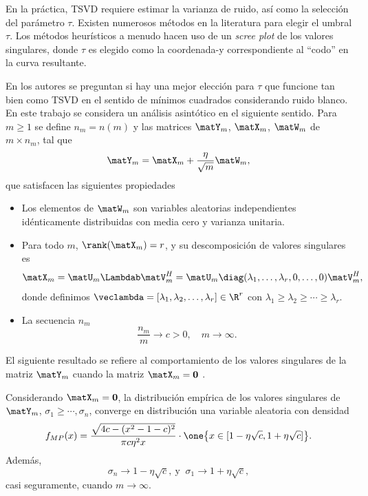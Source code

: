 	En la práctica, TSVD requiere estimar la varianza de ruido, así como la selección del parámetro $\tau$. Existen numerosos métodos en la literatura para elegir el umbral $\tau$. Los métodos heurísticos a menudo hacen uso de un \emph{scree plot} de los valores singulares, donde $\tau$ es elegido como la coordenada-y correspondiente al ``codo'' en la curva resultante.
		
	En \cite{Gavish2014} los autores se preguntan si hay una mejor elección para $\tau$ que funcione tan bien como TSVD en el sentido de mínimos cuadrados considerando ruido blanco. En este trabajo se considera un análisis asintótico en el siguiente sentido. Para $m\ge1$ se define $n_m = n(m)$ y las  matrices $\matY_m$, $\matX_m$, $\matW_m$ de $m\times n_m$, tal que  
	\begin{equation}
		\matY_m = \matX_m +\frac{\eta}{\sqrt{m}}\matW_m,
		\label{eq:AsymptoticModel}
	\end{equation}
	que satisfacen las siguientes propiedades
	\begin{itemize}
		\item Los elementos de $\matW_m$ son variables aleatorias independientes idénticamente distribuidas con media cero y varianza unitaria.
		\item Para todo $m$, $\rank(\matX_m) = r$, y su descomposición de valores singulares es 
		\[\matX_m = \matU_m\Lambdab\matV_m^H = \matU_m\diag(\lambda_1,\ldots,\lambda_r,0,\ldots,0)\matV_m^H,\]
		donde definimos $\veclambda = [\lambda_1, \lambda_2,\ldots,\lambda_r]\in\R^{r}$ con $\lambda_1\ge\lambda_2\ge\cdots\ge\lambda_r.$
		\item La secuencia $n_m$ 
		\[
			\frac{n_m}{m}\to c > 0,\quad m\to\infty.
		\]
	\end{itemize}
		
	El siguiente resultado se refiere al comportamiento de los valores singulares de la matriz $\matY_m$ cuando la matriz $\matX_m = \mathbf{0}$ \cite{Bai2010}.
		
	\begin{prop}\label{Prop:MP}
		Considerando $\matX_m =\mathbf{0}$, la distribución empírica de los valores singulares de $\matY_m$, $\sigma_1\ge\cdots,\sigma_n$, converge en distribución una variable aleatoria con densidad
		\begin{equation}
			f_{MP}(x) = \frac{\sqrt{4c-(x^2-1-c)^2}}{\pi c\eta^2 x}\cdot\one\big\{x\in[1-\eta\sqrt{c},1+\eta\sqrt{c}]\big\}.
			\label{Eq:MPDensity}
		\end{equation}
		Además,
		\begin{equation}
			\sigma_n \to 1-\eta\sqrt{c}, \ \text{y } \ 
			\sigma_1 \to 1+\eta\sqrt{c}, 
		\end{equation}
		casi seguramente, cuando $m\to \infty$.
	\end{prop} 

